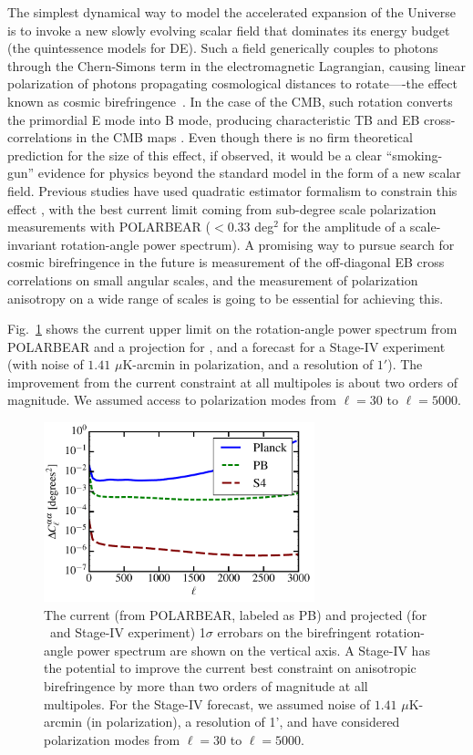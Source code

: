 The simplest dynamical way to model the accelerated expansion of the Universe is to invoke a new slowly evolving scalar field that dominates its energy budget (the quintessence models for DE). Such a field generically couples to photons through the Chern-Simons term in the electromagnetic Lagrangian, causing linear polarization of photons propagating cosmological distances to rotate----the effect known as cosmic birefringence~\cite{Carroll:1998zi}. In the case of the CMB, such rotation converts the primordial E mode into B mode, producing characteristic TB and EB cross-correlations in the CMB maps \cite{Kamionkowski:2008fp,Gluscevic:2009mm}. Even though there is no firm theoretical prediction for the size of this effect, if observed, it would be a clear ``smoking-gun'' evidence for physics beyond the standard model in the form of a new scalar field. Previous studies have used quadratic estimator formalism to constrain this effect \cite{Gluscevic:2012me}, with the best current limit coming from sub-degree scale polarization measurements with POLARBEAR \cite{Ade:2015cao} ($<0.33$ deg$^2$ for the amplitude of a scale-invariant rotation-angle power spectrum). A promising way to pursue search for cosmic birefringence in the future is measurement of the off-diagonal EB cross correlations on small angular scales, and the measurement of polarization anisotropy on a wide range of scales is going to be essential for achieving this. 

Fig.~\ref{fig:CB-forecast} shows the current upper limit on the rotation-angle power spectrum from POLARBEAR and a projection for \planck, and a forecast for a Stage-IV experiment (with noise of $1.41$ $\mu$K-arcmin in polarization, and a resolution of $1'$). The improvement from the current constraint at all multipoles is about two orders of magnitude. We assumed access to polarization modes from $\ell=30$ to $\ell=5000$.
\begin{figure}[h!]
\centering \includegraphics[width=0.70\textwidth]{DarkEnergy/birefringence-S4-planck-PB-v2.pdf}
\caption{The current (from POLARBEAR, labeled as PB) and projected (for \planck\ and Stage-IV experiment) 1$\sigma$ errobars on the birefringent rotation-angle power spectrum are shown on the vertical axis. A Stage-IV has the potential to improve the current best constraint on anisotropic birefringence by more than two orders of magnitude at all multipoles. For the Stage-IV forecast, we assumed noise of $1.41$ $\mu$K-arcmin (in polarization), a resolution of 1', and have considered polarization modes from $\ell=30$ to $\ell=5000$.}
\label{fig:CB-forecast}
\end{figure}

